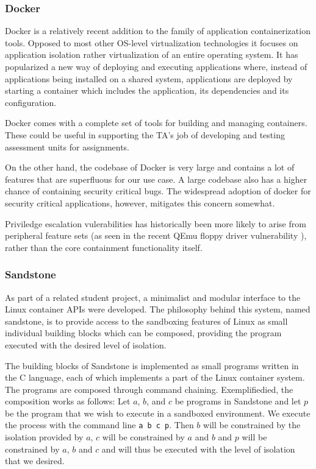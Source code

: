 \subsubsection{Docker}
Docker is a relatively recent addition to the family of application
containerization tools. Opposed to most other OS-level virtualization
technologies it focuses on application isolation rather
virtualization of an entire operating system. It has popularized a new
way of deploying and executing applications where, instead of
applications being installed on a shared system, applications are
deployed by starting a container which includes the application, its
dependencies and its configuration. \cite{whatisdocker}

Docker comes with a complete set of tools for building and managing
containers. These could be useful in supporting the TA's job of
developing and testing assessment units for assignments.

On the other hand, the codebase of Docker is very large and
contains a lot of features that are superfluous for our use
case. A large codebase also has a higher chance of containing security
critical bugs. The widespread adoption of docker for security critical
applications, however, mitigates this concern somewhat.

Priviledge escalation vulerabilities has historically been more likely
to arise from peripheral feature sets (as seen in the recent QEmu
floppy driver vulnerability \cite{CVE-2015-3456}), rather than the core containment
functionality itself.

\subsubsection{Sandstone}
As part of a related student project, a minimalist and modular
interface to the Linux container APIs were developed. The philosophy
behind this system, named sandstone, is to provide access to
the sandboxing features of Linux as small individual building blocks
which can be composed, providing the program executed with the
desired level of isolation.

The building blocks of Sandstone is implemented as small programs
written in the C language, each of which implements a part of the
Linux container system. The programs are composed through command
chaining. Exemplifiedied, the composition works as follows: Let $a$,
$b$, and $c$ be programs in Sandstone and let $p$ be the program that
we wish to execute in a sandboxed environment. We execute the process
with the command line \texttt{a b c p}. Then $b$ will be constrained
by the isolation provided by $a$, $c$ will be constrained by $a$ and
$b$ and $p$ will be constrained by $a$, $b$ and $c$ and will thus be
executed with the level of isolation that we desired. \cite{onlineta}

